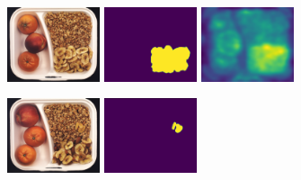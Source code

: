 \begin{figure}[H]
    \centering
    \begin{subfigure}[b]{\textwidth}
        \centering
        \begin{minipage}{0.45\textwidth}
            \centering
            \includegraphics[width=0.3\textwidth]{figures/appendix/appendix_RevDist/BB/010.png}
            \includegraphics[width=0.3\textwidth]{figures/appendix/appendix_RevDist/BB/010_mask.png}
            \includegraphics[width=0.3\textwidth]{figures/appendix/appendix_RevDist/BB/010segment.png}
        \end{minipage}
        \begin{minipage}{0.45\textwidth}
            \centering
            \includegraphics[width=0.3\textwidth]{figures/appendix/appendix_RevDist/BB/038.png}
            \includegraphics[width=0.3\textwidth]{figures/appendix/appendix_RevDist/BB/038_mask.png}

\end{minipage}
\end{subfigure}
\end{figure}

